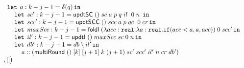 \begin{figure}
\[\begin{array}{l}
 \hspace{0.4cm} \mathop{\mathtt{let}} \; a: k - j - 1 = \delta (q)  \mathop{ \mathtt{in}} \\
 \hspace{0.8cm} \mathop{\mathtt{let}} \; sc': k - j - 1 =  \mathsf{updtSC} \; () \; sc  \; a \; p
                \; q \; il \;  \; 0 \;  n \;  \mathop{ \mathtt{in}} \\
 \hspace{0.8cm} \mathop{\mathtt{let}} \; scc': k - j - 1 =  \mathsf{updtSCC} \; () \; scc \; a \; p
                \; qc \;  \; 0 \;  cr \mathop{ \mathtt{in}} \\
 \hspace{0.8cm} \mathop{\mathtt{let}} \; maxScc: k - j - 1 =  \mathsf{foldl} \; 
                (\lambda acc : \mathtt{real}. \lambda a: \mathtt{real}. 
                \mathtt{if} ( acc < a, a, acc)) \; 0 \; scc' \mathop{ \mathtt{in}} \\
 \hspace{0.8cm} \mathop{\mathtt{let}} \; il': k - j - 1 =  \mathsf{updtI}  \; () \; maxScc \; sc
                \; 0 \; n  \mathop{ \mathtt{in}} \\
 \hspace{0.8cm} \mathop{\mathtt{let}} \; db': k - j - 1 =  db \setminus il' \mathop{ \mathtt{in}} \\
 \hspace{1.2cm} a :: (\mathsf{multiRound} \; () \; [k] \; [j + 1]  
                 \; k \; (j+1) \; sc' \; scc' \; il'
                 \; n \; cr \; db')\\ 
 \hspace{0.2cm} , []  \big)
\end{array}
\]

\end{figure}


